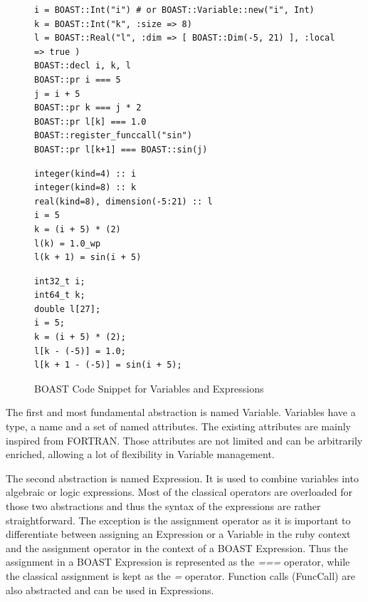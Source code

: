 \documentclass[11pt, a4paper, twoside]{montblanc}
\begin{document}
\begin{figure}
\begin{lstlisting}
i = BOAST::Int("i") # or BOAST::Variable::new("i", Int)
k = BOAST::Int("k", :size => 8)
l = BOAST::Real("l", :dim => [ BOAST::Dim(-5, 21) ], :local => true )
BOAST::decl i, k, l
BOAST::pr i === 5
j = i + 5
BOAST::pr k === j * 2
BOAST::pr l[k] === 1.0
BOAST::register_funccall("sin")
BOAST::pr l[k+1] === BOAST::sin(j)
\end{lstlisting}

\begin{minipage}[b]{0.50\linewidth}
\centering
{}

\begin{lstlisting}
integer(kind=4) :: i
integer(kind=8) :: k
real(kind=8), dimension(-5:21) :: l
i = 5
k = (i + 5) * (2)
l(k) = 1.0_wp
l(k + 1) = sin(i + 5)
\end{lstlisting}
\end{minipage}
\hspace{0.04\linewidth}
\begin{minipage}[b]{0.44\linewidth}
\centering
{}

\begin{lstlisting}
int32_t i;
int64_t k;
double l[27];
i = 5;
k = (i + 5) * (2);
l[k - (-5)] = 1.0;
l[k + 1 - (-5)] = sin(i + 5);
\end{lstlisting}
\end{minipage}
\caption{BOAST Code Snippet for Variables and Expressions}
\label{fig:BOAST_algebra}
\end{figure}
The first and most fundamental abstraction is named Variable. Variables have a
type, a name and a set of named attributes. The existing attributes are mainly
inspired from FORTRAN. Those attributes are not limited and can be arbitrarily
enriched, allowing a lot of flexibility in Variable management.

The second abstraction is named Expression. It is used to combine variables into
algebraic or logic expressions. Most of the classical operators are overloaded
for those two abstractions and thus the syntax of the expressions are rather
straightforward. The exception is the assignment operator as it is important to
differentiate between assigning an Expression or a Variable in the ruby context
and the assignment operator in the context of a BOAST Expression. Thus the
assignment in a BOAST Expression is represented as the \emph{===} operator,
while the classical assignment is kept as the \emph{=} operator. Function calls
(FuncCall) are also abstracted and can be used in Expressions.
\end{document}
